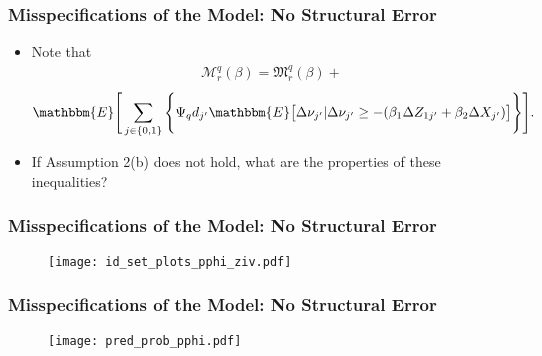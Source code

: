 \begin{frame}
\frametitle{Misspecifications of the Model: No Structural Error}

\begin{itemize}
	\item Note that
	\small
	\begin{align*}
	\mathcal{M}^{q}_{r}(\beta)=\mathfrak{M}^{q}_{r}(\beta)+
	\end{align*}
	\begin{align*}
	\mathbbm{E}\Bigg[\sum_{j\in\{0,1\}}\Bigg\{\Psi_{q}d_{j'}\mathbbm{E}\big[\Delta\nu_{j'}|\Delta\nu_{j'}\geq-(\beta_{1}\Delta Z_{1j'}+\beta_{2}\Delta X_{j'})\big]\Bigg\}\Bigg].
	\end{align*}
	\normalsize
	\item If Assumption 2(b) does not hold, what are the properties of these inequalities?
\end{itemize}
\end{frame}
\begin{frame}
\frametitle{Misspecifications of the Model: No Structural Error}

\begin{figure}[h!]
\centering \texttt{[image: id\_set\_plots\_pphi\_ziv.pdf]}
\end{figure}

\end{frame}

\begin{frame}
\frametitle{Misspecifications of the Model: No Structural Error}

\begin{figure}[h!]
\centering \texttt{[image: pred\_prob\_pphi.pdf]}
\end{figure}

\end{frame}


